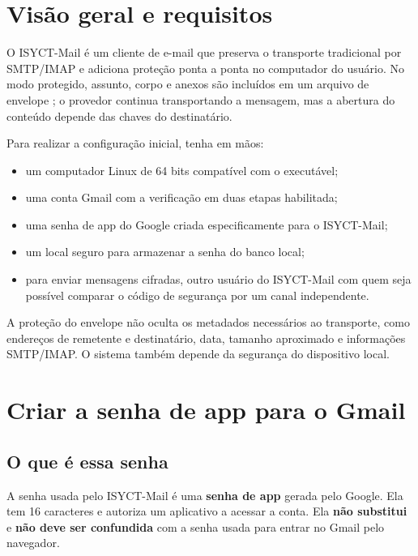 \documentclass[11pt,a4paper]{article}
\newcommand{\filepath}[1]{\texttt{\detokenize{#1}}}
\begin{document}
\section{Visão geral e requisitos}

O ISYCT-Mail é um cliente de e-mail que preserva o transporte tradicional por SMTP/IMAP e adiciona proteção ponta a ponta no computador do usuário. No modo protegido, assunto, corpo e anexos são incluídos em um arquivo de envelope \filepath{.isyct}; o provedor continua transportando a mensagem, mas a abertura do conteúdo depende das chaves do destinatário.

Para realizar a configuração inicial, tenha em mãos:

\begin{itemize}
  \item um computador Linux de 64 bits compatível com o executável;
  \item uma conta Gmail com a verificação em duas etapas habilitada;
  \item uma senha de app do Google criada especificamente para o ISYCT-Mail;
  \item um local seguro para armazenar a senha do banco local;
  \item para enviar mensagens cifradas, outro usuário do ISYCT-Mail com quem seja possível comparar o código de segurança por um canal independente.
\end{itemize}

\begin{infobox}
  A proteção do envelope não oculta os metadados necessários ao transporte, como endereços de remetente e destinatário, data, tamanho aproximado e informações SMTP/IMAP. O sistema também depende da segurança do dispositivo local.
\end{infobox}

\section{Criar a senha de app para o Gmail}

\subsection{O que é essa senha}

A senha usada pelo ISYCT-Mail é uma \textbf{senha de app} gerada pelo Google. Ela tem 16 caracteres e autoriza um aplicativo a acessar a conta. Ela \textbf{não substitui} e \textbf{não deve ser confundida} com a senha usada para entrar no Gmail pelo navegador.
\end{document}
